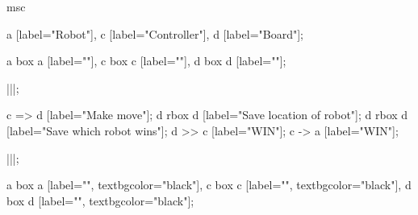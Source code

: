 \begin{msc}
msc
{

a [label="Robot"],
c [label="Controller"],
d [label="Board"];

a box a [label=""],
c box c [label=""],
d box d [label=""];

|||;

c => d [label="Make move"];
d rbox d [label="Save location of robot"];
d rbox d [label="Save which robot wins"];
d >> c [label="WIN"];
c -> a [label="WIN"];

|||;

a box a [label="", textbgcolor="black"],
c box c [label="", textbgcolor="black"],
d box d [label="", textbgcolor="black"];

}
\end{msc}
